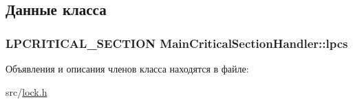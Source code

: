 \subsection{Данные класса}
\hypertarget{class_main_critical_section_handler_ae7635d9e5c74721475bf7fbc813e8895}{
\subsubsection[{lpcs}]{\setlength{\rightskip}{0pt plus 5cm}L\-P\-C\-R\-I\-T\-I\-C\-A\-L\-\_\-\-S\-E\-C\-T\-I\-O\-N Main\-Critical\-Section\-Handler\-::lpcs}}\label{class_main_critical_section_handler_ae7635d9e5c74721475bf7fbc813e8895}


Объявления и описания членов класса находятся в файле\-:\begin{DoxyCompactItemize}
\item 
src/\hyperlink{lock_8h}{lock.\-h}\end{DoxyCompactItemize}
